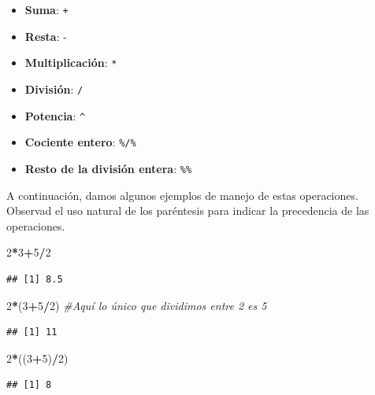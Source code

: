\documentclass[]{book}
\newenvironment{Shaded}{\begin{snugshade}}{\end{snugshade}}
\newcommand{\CommentTok}[1]{\textcolor[rgb]{0.56,0.35,0.01}{\textit{#1}}}
\newcommand{\DecValTok}[1]{\textcolor[rgb]{0.00,0.00,0.81}{#1}}
\newcommand{\NormalTok}[1]{#1}
\newcommand{\OperatorTok}[1]{\textcolor[rgb]{0.81,0.36,0.00}{\textbf{#1}}}
\providecommand{\tightlist}{%
  \setlength{\itemsep}{0pt}\setlength{\parskip}{0pt}}
\theoremstyle{definition}
\theoremstyle{definition}
\theoremstyle{definition}
\theoremstyle{remark}
\begin{document}
\begin{itemize}
\tightlist
\item
  \textbf{Suma}: \texttt{+}
\item
  \textbf{Resta}: -
\item
  \textbf{Multiplicación}: \texttt{*}
\item
  \textbf{División}: \texttt{/}
\item
  \textbf{Potencia}: \texttt{\^{}}
\item
  \textbf{Cociente entero}: \texttt{\%/\%}
\item
  \textbf{Resto de la división entera}: \texttt{\%\%}
\end{itemize}

A continuación, damos algunos ejemplos de manejo de estas operaciones. Observad el uso natural de los paréntesis para indicar la precedencia de las operaciones.

\begin{Shaded}
\begin{Highlighting}[]
\DecValTok{2}\OperatorTok{*}\DecValTok{3}\OperatorTok{+}\DecValTok{5}\OperatorTok{/}\DecValTok{2}
\end{Highlighting}
\end{Shaded}

\begin{verbatim}
## [1] 8.5
\end{verbatim}

\begin{Shaded}
\begin{Highlighting}[]
\DecValTok{2}\OperatorTok{*}\NormalTok{(}\DecValTok{3}\OperatorTok{+}\DecValTok{5}\OperatorTok{/}\DecValTok{2}\NormalTok{) }\CommentTok{#Aquí lo único que dividimos entre 2 es 5}
\end{Highlighting}
\end{Shaded}

\begin{verbatim}
## [1] 11
\end{verbatim}

\begin{Shaded}
\begin{Highlighting}[]
\DecValTok{2}\OperatorTok{*}\NormalTok{((}\DecValTok{3}\OperatorTok{+}\DecValTok{5}\NormalTok{)}\OperatorTok{/}\DecValTok{2}\NormalTok{)}
\end{Highlighting}
\end{Shaded}

\begin{verbatim}
## [1] 8
\end{verbatim}
\end{document}
